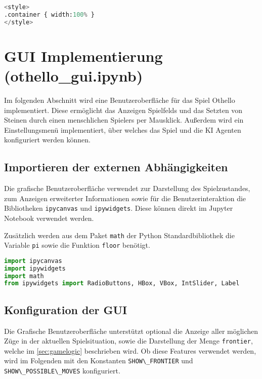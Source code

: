 \begin{lstlisting}[language=Python]
%%HTML
<style>
.container { width:100% }
</style>
\end{lstlisting}

\hypertarget{gui-implementierung-othello_gui.ipynb}{%
\section{GUI Implementierung
(othello\_gui.ipynb)}\label{gui-implementierung-othello_gui.ipynb}}

Im folgenden Abschnitt wird eine Benutzeroberfläche für das Spiel
Othello implementiert. Diese ermöglicht das Anzeigen Spielfelds und das
Setzten von Steinen durch einen menschlichen Spielers per Mausklick.
Außerdem wird ein Einstellungsmenü implementiert, über welches das Spiel
und die KI Agenten konfiguriert werden können.

\hypertarget{importieren-der-externen-abhuxe4ngigkeiten}{%
\subsection{Importieren der externen
Abhängigkeiten}\label{importieren-der-externen-abhuxe4ngigkeiten}}

Die grafische Benutzeroberfläche verwendet zur Darstellung des
Spielzustandes, zum Anzeigen erweiterter Informationen sowie für die
Benutzerinteraktion die Bibliotheken \passthrough{\lstinline!ipycanvas!}
und \passthrough{\lstinline!ipywidgets!}. Diese können direkt im Jupyter
Notebook verwendet werden.

Zusätzlich werden aus dem Paket \passthrough{\lstinline!math!} der
Python Standardbibliothek die Variable \passthrough{\lstinline!pi!}
sowie die Funktion \passthrough{\lstinline!floor!} benötigt.

\begin{lstlisting}[language=Python]
import ipycanvas
import ipywidgets
import math
from ipywidgets import RadioButtons, HBox, VBox, IntSlider, Label
\end{lstlisting}

\hypertarget{konfiguration-der-gui}{%
\subsection{Konfiguration der GUI}\label{konfiguration-der-gui}}

Die Grafische Benutzeroberfläche unterstützt optional die Anzeige aller
möglichen Züge in der aktuellen Spielsituation, sowie die Darstellung
der Menge \passthrough{\lstinline!frontier!}, welche im
\autoref{sec:gamelogic} beschrieben wird. Ob diese Features verwendet
werden, wird im Folgenden mit den Konstanten
\passthrough{\lstinline!SHOW\_FRONTIER!} und
\passthrough{\lstinline!SHOW\_POSSIBLE\_MOVES!} konfiguriert.

